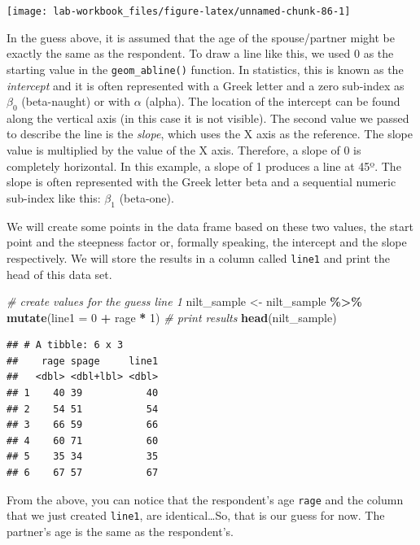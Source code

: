 \documentclass[
]{book}
\newenvironment{Shaded}{\begin{snugshade}}{\end{snugshade}}
\newcommand{\AttributeTok}[1]{\textcolor[rgb]{0.13,0.29,0.53}{#1}}
\newcommand{\CommentTok}[1]{\textcolor[rgb]{0.56,0.35,0.01}{\textit{#1}}}
\newcommand{\DecValTok}[1]{\textcolor[rgb]{0.00,0.00,0.81}{#1}}
\newcommand{\FunctionTok}[1]{\textcolor[rgb]{0.13,0.29,0.53}{\textbf{#1}}}
\newcommand{\NormalTok}[1]{#1}
\newcommand{\OtherTok}[1]{\textcolor[rgb]{0.56,0.35,0.01}{#1}}
\newcommand{\SpecialCharTok}[1]{\textcolor[rgb]{0.81,0.36,0.00}{\textbf{#1}}}
\begin{document}
\begin{flushleft}\texttt{[image: lab-workbook\_files/figure-latex/unnamed-chunk-86-1]} \end{flushleft}

In the guess above, it is assumed that the age of the spouse/partner might be exactly the same as the respondent. To draw a line like this, we used 0 as the starting value in the \texttt{geom\_abline()} function. In statistics, this is known as the \emph{intercept} and it is often represented with a Greek letter and a zero sub-index as \(\beta_0\) (beta-naught) or with \(\alpha\) (alpha). The location of the intercept can be found along the vertical axis (in this case it is not visible). The second value we passed to describe the line is the \emph{slope}, which uses the X axis as the reference. The slope value is multiplied by the value of the X axis. Therefore, a slope of 0 is completely horizontal. In this example, a slope of 1 produces a line at 45º. The slope is often represented with the Greek letter beta and a sequential numeric sub-index like this: \(\beta_1\) (beta-one).

We will create some points in the data frame based on these two values, the start point and the steepness factor or, formally speaking, the intercept and the slope respectively. We will store the results in a column called \texttt{line1} and print the head of this data set.

\begin{Shaded}
\begin{Highlighting}[]
\CommentTok{\# create values for the guess line 1}
\NormalTok{nilt\_sample }\OtherTok{\textless{}{-}}\NormalTok{ nilt\_sample }\SpecialCharTok{\%\textgreater{}\%} 
  \FunctionTok{mutate}\NormalTok{(}\AttributeTok{line1 =} \DecValTok{0} \SpecialCharTok{+}\NormalTok{ rage }\SpecialCharTok{*} \DecValTok{1}\NormalTok{)}
\CommentTok{\# print results}
\FunctionTok{head}\NormalTok{(nilt\_sample)}
\end{Highlighting}
\end{Shaded}

\begin{verbatim}
## # A tibble: 6 x 3
##    rage spage     line1
##   <dbl> <dbl+lbl> <dbl>
## 1    40 39           40
## 2    54 51           54
## 3    66 59           66
## 4    60 71           60
## 5    35 34           35
## 6    67 57           67
\end{verbatim}

From the above, you can notice that the respondent's age \texttt{rage} and the column that we just created \texttt{line1}, are identical\ldots So, that is our guess for now. The partner's age is the same as the respondent's.
\end{document}

